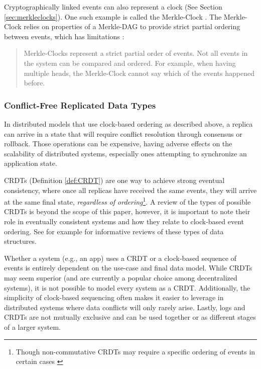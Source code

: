 \documentclass{textile}
\begin{document}
Cryptographically linked events can also represent a clock (See Section \ref{sec:merkleclocks}). One such example is called the Merkle-Clock \cite{sanjuanMerkleCRDTs2019}. The Merkle-Clock relies on properties of a Merkle-DAG to provide strict partial ordering between events, which has limitations \cite[sec. 4.3]{sanjuanMerkleCRDTs2019}:

\begin{quote}
Merkle-Clocks represent a strict partial order of events. Not all events in the system can be compared and ordered. For example, when having multiple heads, the Merkle-Clock cannot say which of the events happened before.
\end{quote}

\subsubsection{Conflict-Free Replicated Data Types}\label{sec:CRDTs}

In distributed models that use clock-based ordering as described above, a replica can arrive in a state that will require conflict resolution through consensus or rollback. Those operations can be expensive, having adverse effects on the scalability of distributed systems, especially ones attempting to synchronize an application state. 

CRDTs (Definition \ref{def:CRDT}) are one way to achieve strong eventual consistency, where once all replicas have received the same events, they will arrive at the same final state, \emph{regardless of ordering}\footnote{Though non-commutative CRDTs may require a specific ordering of events in certain cases \cite{sanjuanMerkleCRDTs2019}}. A review of the types of possible CRDTs is beyond the scope of this paper, however, it is important to note their role in eventually consistent systems and how they relate to clock-based event ordering. See for example \cite{enesSingleWriterPrincipleCRDT2017,sanjuanMerkleCRDTs2019} for informative reviews of these types of data structures.

Whether a system (e.g., an app) uses a CRDT or a clock-based sequence of events is entirely dependent on the use-case and final data model. While CRDTs may seem superior (and are currently a popular choice among decentralized systems), it is not possible to model every system as a CRDT. Additionally, the simplicity of clock-based sequencing often makes it easier to leverage in distributed systems where data conflicts will only rarely arise. Lastly, logs and CRDTs are not mutually exclusive and can be used together or as different stages of a larger system.
\end{document}

